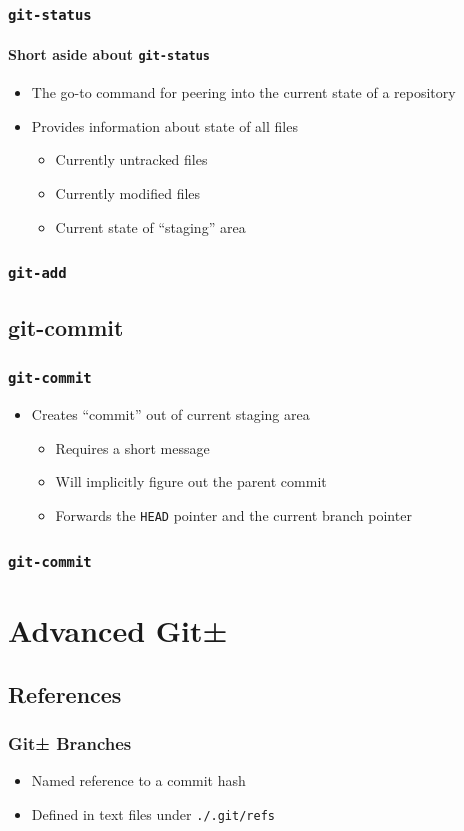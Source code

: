 \documentclass{beamer}
\begin{document}
\begin{frame}
\frametitle{\texttt{git-status}}
\framesubtitle{Short aside about \texttt{git-status}}
\begin{itemize}
\item{The go-to command for peering into the current state of a repository}
\item{Provides information about state of all files}
\begin{itemize}
\item{Currently untracked files}
\item{Currently modified files}
\item{Current state of ``staging'' area}
\end{itemize}
\end{itemize}
\end{frame}

\begin{frame}[fragile]
\frametitle{\texttt{git-add}}

\end{frame}

\subsection{git-commit}
\begin{frame}
\frametitle{\texttt{git-commit}}
\begin{itemize}
\item{Creates ``commit'' out of current staging area}
\begin{itemize}
\item{Requires a short message}
\item{Will implicitly figure out the parent commit}
\item{Forwards the \texttt{HEAD} pointer and the current branch pointer}
\end{itemize}
\end{itemize}
\end{frame}

\begin{frame}[fragile]
\frametitle{\texttt{git-commit}}

\end{frame}

\section{Advanced Git±}
\subsection{References}
\begin{frame}
\frametitle{Git± Branches}
\begin{itemize}
\item<2->{Named reference to a commit hash}
\item<3->{Defined in text files under \texttt{./.git/refs}}
\end{itemize}
\end{frame}
\end{document}
